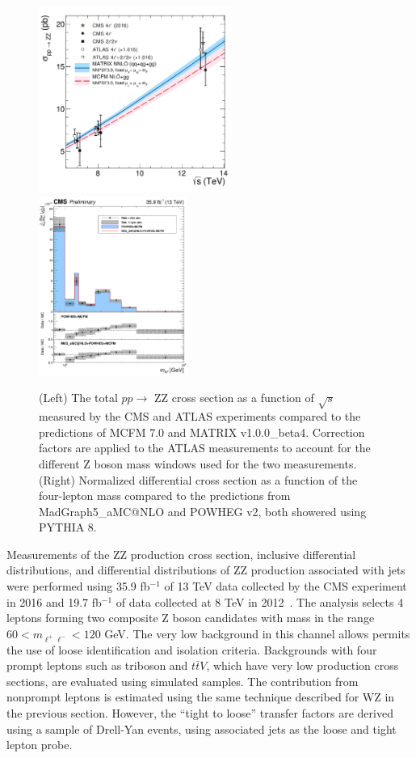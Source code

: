 \documentclass[10pt]{article}
\begin{document}
\begin{figure}[htb]
  \centering
    \includegraphics[height=2.4in]{figures/ZZCrossSection_vs_sqrtS.pdf}
    \includegraphics[height=2.3in]{figures/ZZ_13TeV_mZZ_unfolded.pdf}
    \caption{ (Left) The total $pp \rightarrow$ ZZ cross section
      as a function of $\sqrt{s}$ measured by the CMS and 
      ATLAS experiments compared to the predictions of MCFM 7.0 and MATRIX v1.0.0\_beta4. 
      Correction factors are applied to the ATLAS measurements to account
      for the different Z boson mass windows used for the two measurements.
      (Right) Normalized differential cross section as a function
      of the four-lepton mass compared to the predictions from
      MadGraph5\_aMC@NLO and POWHEG v2, both showered using PYTHIA 8.
      }
  \label{fig:ZZinclusive}
\end{figure}

Measurements of the ZZ production cross section, inclusive differential distributions,
and differential distributions of ZZ production associated with jets
were performed using 35.9 fb$^{-1}$ of 13 TeV data collected by the CMS experiment in 2016
\cite{CMS:2017ruh}
\cite{CMS-PAS-SMP-16-019}
and 19.7 fb$^{-1}$ of data collected at 8 TeV in 2012~\cite{CMS-PAS-SMP-15-010}. 
The analysis selects 4 leptons forming two composite 
Z boson candidates with
mass in the range $60 < m_{\ell^{+}\ell^{-}} < 120$ GeV. The very low background
in this channel allows permits the use of loose identification and isolation criteria. 
Backgrounds with four prompt leptons such as triboson and $t\bar{t}V$, 
which have very
low production cross sections, are evaluated using simulated samples. The 
contribution from nonprompt leptons is estimated using the same technique
described for WZ in the previous section. However, the ``tight to loose'' transfer 
factors are derived using a sample of Drell-Yan events, using associated 
jets as the loose and tight lepton probe.
\end{document}
